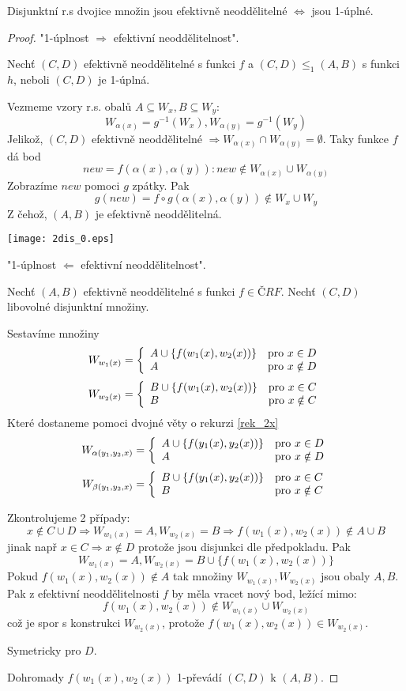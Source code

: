 \begin{theorem}
	Disjunktní r.s dvojice množin jsou efektivně neoddělitelné $\iff$ jsou 1-úplné.
\end{theorem}
\begin{proof}
	"1-úplnost $\Rightarrow$ efektivní neoddělitelnost".

	Nechť $(C, D)$ efektivně neoddělitelné s funkci $f$ a $(C, D) \leq_1 (A, B)$ s funkci $h$, neboli $(C, D)$ je 1-úplná.

	Vezmeme vzory r.s. obalů $A \subseteq W_x, B \subseteq W_y$:
	\[ W_{\alpha(x)} = g^{-1}(W_x), W_{\alpha(y)} = g^{-1}(W_y) \]
	Jelikož, $(C, D)$ efektivně neoddělitelné $\Rightarrow W_{\alpha(x)} \cap W_{\alpha(y)} = \emptyset$.
	Taky funkce $f$ dá bod
	\[ new = f(\alpha(x), \alpha(y)): new \notin W_{\alpha(x)} \cup W_{\alpha(y)} \]
	Zobrazíme $new$ pomoci $g$ zpátky. Pak
	\[ g(new) = f \circ g(\alpha(x), \alpha(y)) \notin W_x \cup W_y\]
	Z čehož, $(A, B)$ je efektivně neoddělitelná.

\texttt{[image: 2dis\_0.eps]}

	"1-úplnost $\Leftarrow$ efektivní neoddělitelnost".

	Nechť $(A, B)$ efektivně neoddělitelné s funkci $f \in ČRF$.
	Nechť $(C, D)$ libovolné disjunktní množiny.

	Sestavíme množiny
	\[ W_{w_1(x)} = \left\{ \begin{array}{ll}  A \cup \{ f(w_1(x), w_2(x)) \}  & \mbox{pro }  x \in D  \\  A  & \mbox{pro }  x \notin D  \end{array} \right. \]
	\[ W_{w_2(x)} = \left\{ \begin{array}{ll}  B \cup \{ f(w_1(x), w_2(x)) \}  & \mbox{pro }  x \in C  \\  B  & \mbox{pro }  x \notin C  \end{array} \right. \]
	Které dostaneme pomoci dvojné věty o rekurzi \cref{rek_2x}
	\[ W_{\alpha(y_1, y_2, x)} = \left\{ \begin{array}{ll}  A \cup \{ f(y_1(x), y_2(x)) \}  & \mbox{pro }  x \in D  \\  A  & \mbox{pro }  x \notin D  \end{array} \right. \]
	\[ W_{\beta(y_1, y_2, x)} = \left\{ \begin{array}{ll}  B \cup \{ f(y_1(x), y_2(x)) \}  & \mbox{pro }  x \in C  \\  B  & \mbox{pro }  x \notin C  \end{array} \right. \]


	Zkontrolujeme 2 případy:
	\[ x \notin C \cup D \Rightarrow W_{w_1(x)} = A, W_{w_2(x)} = B \Rightarrow f(w_1(x), w_2(x)) \notin A \cup B \]
	jinak např $x \in C \Rightarrow x \notin D$ protože jsou disjunkci dle předpokladu.
	Pak
	\[ W_{w_1(x)} = A, W_{w_2(x)} = B \cup \{ f(w_1(x), w_2(x)) \} \]
	Pokud $f(w_1(x), w_2(x)) \notin A$ tak množiny $W_{w_1(x)}, W_{w_2(x)}$ jsou obaly $A, B$.
	Pak z efektivní neoddělitelnosti $f$ by měla vracet nový bod, ležící mimo:
	\[ f(w_1(x), w_2(x)) \notin W_{w_1(x)} \cup W_{w_2(x)} \]
	což je spor s konstrukci $W_{w_2(x)}$, protože $f(w_1(x), w_2(x)) \in W_{w_2(x)}$.

	Symetricky pro $D$.

	Dohromady $f(w_1(x), w_2(x))$ 1-převádí $(C, D)$ k $(A, B)$.
\end{proof}
